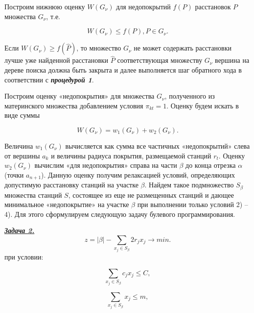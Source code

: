 Построим нижнюю оценку $W(G_{\nu} )$ для недопокрытий $f(P)$ расстановок $P$ множества $G_\nu$, т.е. 

\begin{displaymath}
W(G_\nu) \leq f(P), P \in G_\nu. 
\end{displaymath}

Если $W(G_\nu) \geq f(\widehat{P})$, то множество $G_\nu$ не может содержать расстановки лучше уже найденной расстановки $\widehat{P}$ соответствующая множеству $G_\nu$  вершина на дереве поиска должна быть закрыта и далее выполняется шаг обратного хода в соответствии с  \textit{\textbf{процедурой 1}}. 

Построим оценку «недопокрытия» для множества $G_\nu$, полученного из материнского множества добавлением условия $\pi_{kt}=1$. Оценку будем искать в виде суммы

\begin{equation}
  \label{eq:part4_noncoverage_estimation}
  W\left(G_\nu\right) = w_1 \left(G_\nu \right) + w_2 \left(G_\nu \right). 
\end{equation}

Величина $w_1 \left(G_\nu \right)$ вычисляется как сумма все частичных «недопокрытий» слева от вершины $a_k$ и величины радиуса покрытия, размещаемой станций $r_t$. Оценку $w_2 \left(G_\nu \right)$ вычислим «для недопокрытия» справа на части $\beta$ до конца отрезка $\alpha$ (точки $a_{n+1}$). Данную оценку получим релаксацией условий, определяющих допустимую расстановку станций на участке $\beta$. Найдем такое подмножество $S_\beta$ множества станций $S$, состоящее из еще не размещенных станций и дающее минимальное «недопокрытие» на участке $\beta$ при выполнении только условий 2) – 4). Для этого сформулируем следующую задачу булевого программирования.

\underline{\textit{\textbf{Задача 2.}}}
\begin{displaymath}
    z = |\beta| - \sum\limits_{x_j \in S_\beta} 2r_j x_j \rightarrow min.
\end{displaymath}
при условии:

\begin{equation}\label{eq:part4_task2_cost}
    \sum\limits_{x_j \in S_\beta} c_j x_j \leqslant C,
\end{equation}

\begin{equation}\label{eq:part4_task2_m}
    \sum\limits_{x_j \in S_\beta} x_j \leqslant m,
\end{equation}

